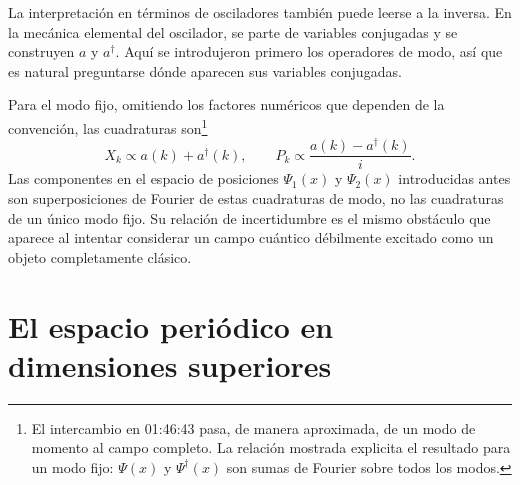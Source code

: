 La interpretación en términos de osciladores también puede leerse a la inversa. En la mecánica elemental del oscilador, se parte de variables conjugadas y se construyen \(a\) y \(a^\dagger\). Aquí se introdujeron primero los operadores de modo, así que es natural preguntarse dónde aparecen sus variables conjugadas.

\begin{classroomqa}
\end{classroomqa}

Para el modo fijo, omitiendo los factores numéricos que dependen de la convención, las cuadraturas son\footnote{El intercambio en 01:46:43 pasa, de manera aproximada, de un modo de momento al campo completo. La relación mostrada explicita el resultado para un modo fijo: \(\Psi(x)\) y \(\Psi^\dagger(x)\) son sumas de Fourier sobre todos los modos.}
\begin{equation}
X_k\propto a(k)+a^\dagger(k),
\qquad
P_k\propto \frac{a(k)-a^\dagger(k)}{i}.
\end{equation}
Las componentes en el espacio de posiciones \(\Psi_1(x)\) y \(\Psi_2(x)\) introducidas antes son superposiciones de Fourier de estas cuadraturas de modo, no las cuadraturas de un único modo fijo. Su relación de incertidumbre es el mismo obstáculo que aparece al intentar considerar un campo cuántico débilmente excitado como un objeto completamente clásico.

\section{El espacio periódico en dimensiones superiores}

\begin{classroomqa}
\end{classroomqa}

